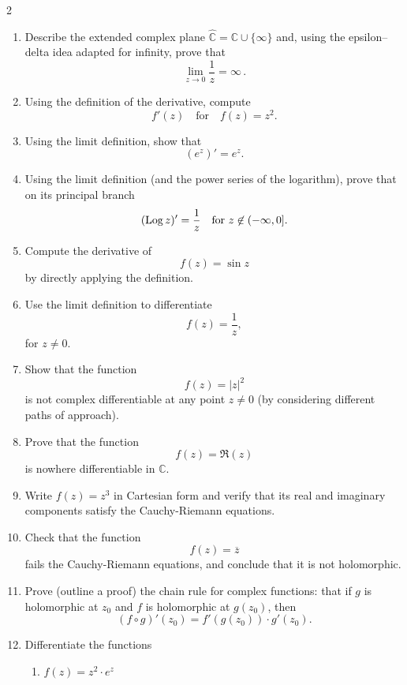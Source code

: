 \begin{multicols}{2}
\begin{enumerate}
  \item Describe the extended complex plane \(\hat{\mathbb{C}} = \mathbb{C} \cup \{\infty\}\) and, using the epsilon–delta idea adapted for infinity, prove that
    \[
    \lim_{z\to 0}\frac{1}{z} = \infty\,.
    \]


  \item Using the definition of the derivative, compute
  \[
  f'(z) \quad \text{for} \quad f(z)=z^2.
  \]

  \item Using the limit definition, show that
  \[
  (e^z)'=e^z.
  \]

  \item Using the limit definition (and the power series of the logarithm), prove that on its principal branch
  \[
  (\operatorname{Log} z)'=\frac{1}{z}\quad \text{for } z\not\in(-\infty,0].
  \]

  \item Compute the derivative of
  \[
  f(z)=\sin z
  \]
  by directly applying the definition.

  \item Use the limit definition to differentiate
  \[
  f(z)=\frac{1}{z},
  \]
  for \(z\neq 0\).

  \item Show that the function
  \[
  f(z)=|z|^2
  \]
  is not complex differentiable at any point \(z\neq 0\) (by considering different paths of approach).

  \item Prove that the function
  \[
  f(z)=\Re(z)
  \]
  is nowhere differentiable in \(\mathbb{C}\).

  \item Write \(f(z)=z^3\) in Cartesian form and verify that its real and imaginary components satisfy the Cauchy-Riemann equations.

  \item Check that the function
  \[
  f(z)=\overline{z}
  \]
  fails the Cauchy-Riemann equations, and conclude that it is not holomorphic.

  \item Prove (outline a proof) the chain rule for complex functions: that if \(g\) is holomorphic at \(z_0\) and \(f\) is holomorphic at \(g(z_0)\), then
  \[
  (f\circ g)'(z_0)=f'(g(z_0))\cdot g'(z_0).
  \]

  \item Differentiate the functions
\begin{enumerate}
 \item  \(
  f(z)=z^2\cdot e^z
  \)


\end{enumerate}
\end{enumerate}
\end{multicols}
